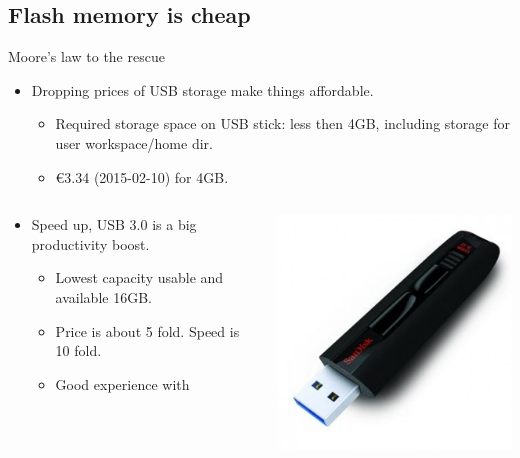 \subsection[Flash]{Flash memory is cheap}
\begin{frame}{Moore's law to the rescue}
  
  \begin{itemize}
  \item Dropping prices of USB storage make things affordable.
    \begin{itemize}
    \item Required storage space on USB stick: less then 4GB,
      including storage for user workspace/home dir.
    \item \euro 3.34 (2015-02-10) for 4GB.
    \end{itemize}
  \end{itemize}
  \begin{columns}
    \begin{column}[c]{.65\textwidth}
      \begin{itemize}
      \item Speed up, USB 3.0 is a big productivity boost.
        \begin{itemize}
        \item Lowest capacity usable and available 16GB.
        \item Price is about 5 fold. Speed is 10 fold.
        \item Good experience with 
        \end{itemize}
      \end{itemize}
    \end{column}
    \begin{column}[c]{.35\textwidth}
      \includegraphics[width=\textwidth]{figures/SDCZ80-300x300.jpg}

\end{column}
\end{columns}
\end{frame}
